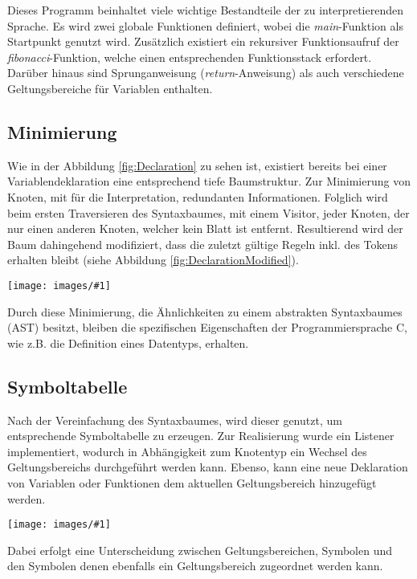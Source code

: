 \documentclass[]{lni}
\newcommand{\pic}[3]{
	\begin{figure*}
		\centering
		\texttt{[image: images/\#1]}
		\caption{#2}
		\label{fig:#3}       %
	\end{figure*}
}
\newcommand{\picSmall}[3]{
	\begin{figure*}
		\centering
		\texttt{[image: images/\#1]}
		\caption{#2}
		\label{fig:#3}       %
	\end{figure*}
}
\begin{document}
Dieses Programm beinhaltet viele wichtige Bestandteile der zu interpretierenden Sprache. Es wird zwei globale Funktionen definiert, wobei die \textit{main}-Funktion als Startpunkt genutzt wird. Zusätzlich existiert ein rekursiver Funktionsaufruf der \textit{fibonacci}-Funktion, welche einen entsprechenden Funktionsstack erfordert. Darüber hinaus sind Sprunganweisung (\textit{return}-Anweisung) als auch verschiedene Geltungsbereiche für Variablen enthalten.
\subsection{Minimierung} 
Wie in der Abbildung \ref{fig:Declaration} zu sehen ist, existiert bereits bei einer Variablendeklaration eine entsprechend tiefe Baumstruktur. Zur Minimierung von Knoten, mit für die Interpretation, redundanten Informationen. Folglich wird beim ersten Traversieren des Syntaxbaumes, mit einem Visitor, jeder Knoten, der nur einen anderen Knoten, welcher kein Blatt ist entfernt. Resultierend wird der Baum dahingehend modifiziert, dass die zuletzt gültige Regeln inkl. des Tokens erhalten bleibt (siehe Abbildung \ref{fig:DeclarationModified}).

\picSmall{declarationModified.png}{Erzeugter Teilbaum einer Variablendeklaration}{DeclarationModified}

Durch diese Minimierung, die Ähnlichkeiten zu einem abstrakten Syntaxbaumes (AST) besitzt, bleiben die spezifischen Eigenschaften der Programmiersprache C, wie z.B. die Definition eines Datentyps, erhalten. 

\subsection{Symboltabelle}

Nach der Vereinfachung des Syntaxbaumes, wird dieser genutzt, um entsprechende Symboltabelle zu erzeugen. Zur Realisierung wurde ein Listener implementiert, wodurch in Abhängigkeit zum Knotentyp ein Wechsel des Geltungsbereichs durchgeführt werden kann. Ebenso, kann eine neue Deklaration von Variablen oder Funktionen dem aktuellen Geltungsbereich hinzugefügt werden.

 \pic{symboltable.png}{vereinfachte Darstellung der Symboltabelle (Grafik entnommen aus \cite{Parr2009})}{DeclarationModified}
 
 \newpage
Dabei erfolgt eine Unterscheidung zwischen Geltungsbereichen, Symbolen und den Symbolen denen ebenfalls ein Geltungsbereich zugeordnet werden kann.
\end{document}
